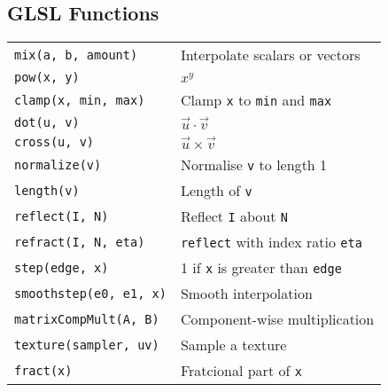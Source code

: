 \documentclass{article}
\begin{document}
\begin{landscape}
\begin{multicols}{3}
            \section{GLSL Functions}
            \begin{small}
                \begin{tabular}{l l}
                    \texttt{mix(a, b, amount)} & Interpolate scalars or vectors \\
                    \texttt{pow(x, y)} & $x^y$ \\
                    \texttt{clamp(x, min, max)} & Clamp \texttt{x} to \texttt{min} and \texttt{max} \\
                    \texttt{dot(u, v)} & $\vec u \cdot \vec v$ \\
                    \texttt{cross(u, v)} & $\vec u \times \vec v$ \\
                    \texttt{normalize(v)} & Normalise \texttt{v} to length 1 \\
                    \texttt{length(v)} & Length of \texttt{v} \\
                    \texttt{reflect(I, N)} & Reflect \texttt{I} about \texttt{N} \\
                    \texttt{refract(I, N, eta)} & \texttt{reflect} with index ratio \texttt{eta} \\
                    \texttt{step(edge, x)} & 1 if \texttt{x} is greater than \texttt{edge} \\
                    \texttt{smoothstep(e0, e1, x)} & Smooth interpolation \\
                    \texttt{matrixCompMult(A, B)} & Component-wise multiplication \\
                    \texttt{texture(sampler, uv)} & Sample a texture \\
                    \texttt{fract(x)} & Fratcional part of \texttt{x} \\
                \end{tabular}
            \end{small}

\end{multicols}
\end{landscape}
\end{document}
